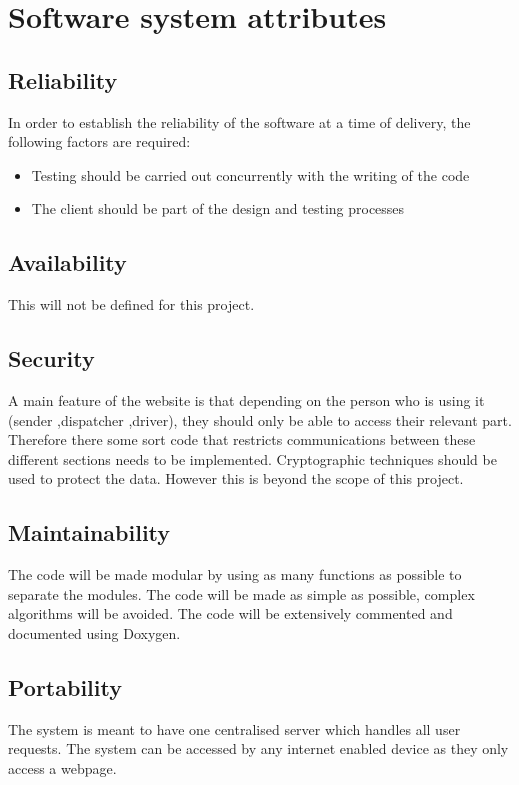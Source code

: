 \documentclass[paper=a4, fontsize=11pt]{scrartcl} %
\numberwithin{equation}{section} %
\numberwithin{figure}{section} %
\numberwithin{table}{section} %
\begin{document}
\section{Software system attributes}
\subsection{Reliability}
In order to establish the reliability of the software at a time of delivery, the following factors are required:
\begin{itemize}
			\item Testing should be carried out concurrently with the writing of the code
			\item The client should be part of the design and testing processes
			  
\end{itemize}
	

\subsection{Availability}
This will not be defined for this project.
\subsection{Security}
 A main feature of the website is that depending on the person who is using it (sender ,dispatcher ,driver), they should only be able to access their relevant part. Therefore there some sort code that restricts communications between these different sections needs to be implemented.
Cryptographic techniques should be used to protect the data. However this is beyond the scope of this project.
\subsection{Maintainability}
The code will be made modular by using as many functions as possible to separate the modules. The code will be made as simple as possible, complex algorithms will be avoided. The code will be extensively commented and documented using Doxygen.
\subsection{Portability}
The system is meant to have one centralised server which handles all user requests. The system can be accessed by any internet enabled device as they only access a webpage.


\end{document}
